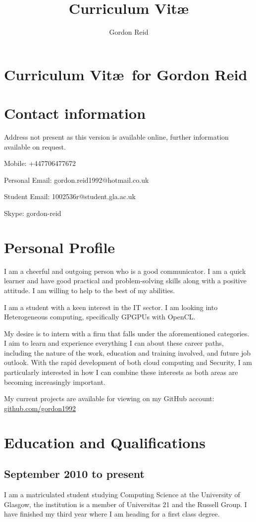 \documentclass[11pt,a4paper]{article}
\title{Curriculum Vit\ae}
\author{Gordon Reid}
\begin{document}
\section*{Curriculum Vit\ae\ for Gordon Reid}
\section*{Contact information}
Address not present as this version is available online, further information
available on request.

Mobile: +447706477672

Personal Email: gordon.reid1992@hotmail.co.uk

Student Email: 1002536r@student.gla.ac.uk

Skype: gordon-reid

\section*{Personal Profile}

I am a cheerful and outgoing person who is a good communicator. I am a quick
learner and have good practical and problem-solving skills along with a
positive attitude. I am willing to help to the best of my abilities.

I am a student with a keen interest in the IT sector. I am looking into 
Heterogeneous computing, specifically GPGPUs with OpenCL.

My desire is to intern with a firm that falls under the aforementioned
categories. I aim to learn and experience everything I can about these
career paths, including the nature of the work, education and training
involved, and future job outlook. With the rapid development of both cloud
computing and Security, I am particularly interested in how I can combine these
interests as both areas are becoming increasingly important.

My current projects are available for viewing on my GitHub account: \url{github.com/gordon1992}

\section*{Education and Qualifications}

\subsection*{September 2010 to present}

I am a matriculated student studying Computing Science at the University of
Glasgow, the institution is a member of Universitas 21 and the Russell Group.
I have finished my third year where I am heading for a first class degree.
\end{document}
